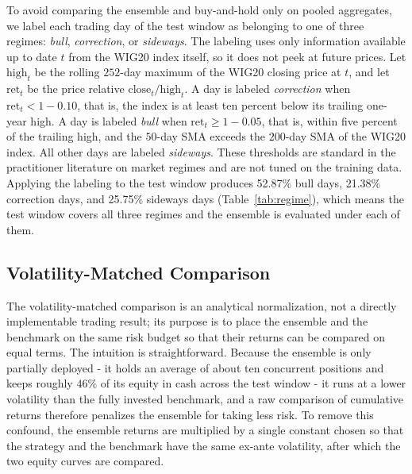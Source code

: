 \documentclass{ieeeaccess}
\newcommand{\RegBullShare}{52.87\%}
\newcommand{\RegCorrectionShare}{21.38\%}
\newcommand{\RegSidewaysShare}{25.75\%}
\begin{document}
To avoid comparing the ensemble and buy-and-hold only on pooled aggregates, we label each trading day of the test window as belonging to one of three regimes: \emph{bull}, \emph{correction}, or \emph{sideways}. The labeling uses only information available up to date $t$ from the WIG20 index itself, so it does not peek at future prices. Let $\mathrm{high}_t$ be the rolling $252$-day maximum of the WIG20 closing price at $t$, and let $\mathrm{ret}_t$ be the price relative $\mathrm{close}_t / \mathrm{high}_t$. A day is labeled \emph{correction} when $\mathrm{ret}_t < 1 - 0.10$, that is, the index is at least ten percent below its trailing one-year high. A day is labeled \emph{bull} when $\mathrm{ret}_t \geq 1 - 0.05$, that is, within five percent of the trailing high, and the $50$-day SMA exceeds the $200$-day SMA of the WIG20 index. All other days are labeled \emph{sideways}. These thresholds are standard in the practitioner literature on market regimes and are not tuned on the training data. Applying the labeling to the test window produces \RegBullShare{} bull days, \RegCorrectionShare{} correction days, and \RegSidewaysShare{} sideways days (Table~\ref{tab:regime}), which means the test window covers all three regimes and the ensemble is evaluated under each of them.

\subsection{Volatility-Matched Comparison}
\label{subsec:volmatch}

The volatility-matched comparison is an analytical normalization, not a directly implementable trading result; its purpose is to place the ensemble and the benchmark on the same risk budget so that their returns can be compared on equal terms. The intuition is straightforward. Because the ensemble is only partially deployed - it holds an average of about ten concurrent positions and keeps roughly $46\%$ of its equity in cash across the test window - it runs at a lower volatility than the fully invested benchmark, and a raw comparison of cumulative returns therefore penalizes the ensemble for taking less risk. To remove this confound, the ensemble returns are multiplied by a single constant chosen so that the strategy and the benchmark have the same ex-ante volatility, after which the two equity curves are compared.
\end{document}
